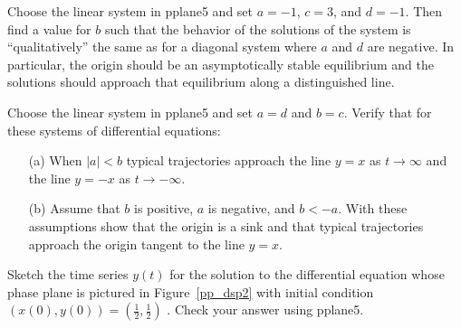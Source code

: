 \begin{exercise} \label{c3.5.2}
Choose the {\sf linear system} in {\sf pplane5} and set
$a=-1$, $c=3$, and $d=-1$.
Then find a value for $b$ such that the behavior of the
solutions of the system is ``qualitatively'' the same as for a
diagonal system where $a$ and $d$ are negative.  In particular,
the origin should be an asymptotically stable equilibrium and
the solutions should approach that equilibrium along a
distinguished line.
\end{exercise}

\begin{exercise} \label{c3.5.3}
Choose the {\sf linear system} in {\sf pplane5} and set
$a=d$ and $b=c$.  Verify that for these systems of differential
equations:
\begin{itemize}
\item[(a)]  When $|a|<b$ typical trajectories approach the line
$y=x$ as $t\to\infty$ and the line $y=-x$ as $t\to -\infty$.
\item[(b)]  Assume that $b$ is positive, $a$ is negative, and $b<-a$. 
With these assumptions show that the origin is a sink and that typical 
trajectories approach the origin tangent to the line $y=x$.
\end{itemize}
\end{exercise}

\TEXER

\begin{exercise} \label{c3.5.4}
Sketch the time series $y(t)$ for the solution to the
differential equation whose phase plane is pictured in
Figure~\ref{pp_dsp2} with initial condition
$(x(0),y(0))=(\frac{1}{2},\frac{1}{2})$ .  Check your answer
using {\sf pplane5}.
\end{exercise}

